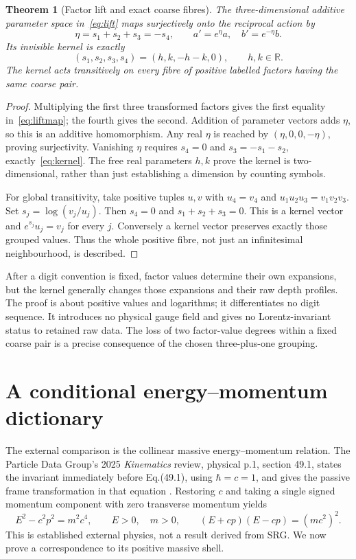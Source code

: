 \documentclass[11pt,a4paper]{article}
\newtheorem{theorem}{Theorem}[section]
\newcommand{\RR}{\mathbb R}
\begin{document}
\begin{theorem}[Factor lift and exact coarse fibres]
The three-dimensional additive parameter space in~\eqref{eq:lift} maps surjectively onto the reciprocal action by
\begin{equation}
 \eta=s_1+s_2+s_3=-s_4,
 \qquad a'=e^\eta a,\quad b'=e^{-\eta}b.
 \label{eq:liftmap}
\end{equation}
Its invisible kernel is exactly
\begin{equation}
 (s_1,s_2,s_3,s_4)=(h,k,-h-k,0),\qquad h,k\in\RR.
 \label{eq:kernel}
\end{equation}
The kernel acts transitively on every fibre of positive labelled factors having the same coarse pair.
\end{theorem}
\begin{proof}
Multiplying the first three transformed factors gives the first equality in~\eqref{eq:liftmap}; the fourth gives the second. Addition of parameter vectors adds $\eta$, so this is an additive homomorphism. Any real $\eta$ is reached by $(\eta,0,0,-\eta)$, proving surjectivity. Vanishing $\eta$ requires $s_4=0$ and $s_3=-s_1-s_2$, exactly~\eqref{eq:kernel}. The free real parameters $h,k$ prove the kernel is two-dimensional, rather than just establishing a dimension by counting symbols.

For global transitivity, take positive tuples $u,v$ with $u_4=v_4$ and $u_1u_2u_3=v_1v_2v_3$. Set $s_j=\log(v_j/u_j)$. Then $s_4=0$ and $s_1+s_2+s_3=0$. This is a kernel vector and $e^{s_j}u_j=v_j$ for every $j$. Conversely a kernel vector preserves exactly those grouped values. Thus the whole positive fibre, not just an infinitesimal neighbourhood, is described.
\end{proof}
After a digit convention is fixed, factor values determine their own expansions, but the kernel generally changes those expansions and their raw depth profiles. The proof is about positive values and logarithms; it differentiates no digit sequence. It introduces no physical gauge field and gives no Lorentz-invariant status to retained raw data. The loss of two factor-value degrees within a fixed coarse pair is a precise consequence of the chosen three-plus-one grouping.

\section{A conditional energy--momentum dictionary}
\label{sec:physical}
The external comparison is the collinear massive energy--momentum relation. The Particle Data Group's 2025 \emph{Kinematics} review, physical p.1, section 49.1, states the invariant immediately before Eq.(49.1), using $\hbar=c=1$, and gives the passive frame transformation in that equation \cite{pdg}. Restoring $c$ and taking a single signed momentum component with zero transverse momentum yields
\begin{equation}
 E^2-c^2p^2=m^2c^4,\qquad E>0,\quad m>0,
 \qquad (E+cp)(E-cp)=(mc^2)^2.
 \label{eq:physicalinvariant}
\end{equation}
This is established external physics, not a result derived from SRG. We now prove a correspondence to its positive massive shell.
\end{document}
